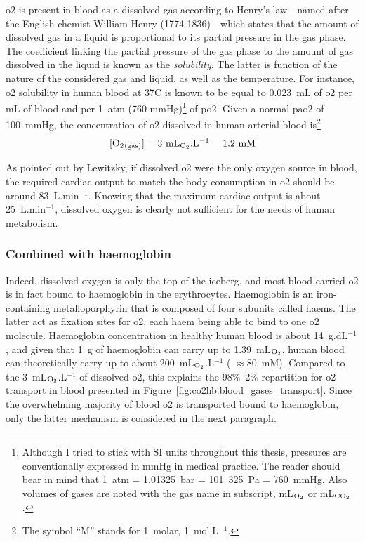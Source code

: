 \gls{o2} is present in blood as a dissolved gas according to Henry's law---named after the English chemist William Henry (1774-1836)---which states that the amount of dissolved gas in a liquid is proportional to its partial pressure in the gas phase\cite{henry1803}. The coefficient linking the partial pressure of the gas phase to the amount of gas dissolved in the liquid is known as the \emph{solubility}. The latter is function of the nature of the considered gas and liquid, as well as the temperature. For instance, \gls{o2} solubility in human blood at 37{\degree}C is known to be equal to 0.023~mL of \gls{o2} per mL of blood and per 1~atm (760 mmHg)\footnote{Although I tried to stick with SI units throughout this thesis, pressures are conventionally expressed in mmHg in medical practice. The reader should bear in mind that 1~atm = 1.01325~bar = 101~325~Pa = 760~mmHg. Also volumes of gases are noted with the gas name in subscript, \eg{} mL$_{\ce{O2}}$ or mL$_{\ce{CO2}}$.} of \gls{po2}\cite{resp_care}. Given a normal \gls{pao2} of 100~mmHg\cite{malatesha2007}, the concentration of \gls{o2} dissolved in human arterial blood is\footnote{The symbol \enquote{M} stands for 1~molar, \ie{} 1~mol.L$^{-1}$.}
\begin{equation}
	\ce{[O2_{(gas)}]} = 3 \text{ mL}_{\ce{O2}}.\text{L}^{-1} = 1.2 \text{ mM}
\end{equation}

As pointed out by Lewitzky\cite[p.~143]{levitzky2003pulmonary}, if dissolved \gls{o2} were the only oxygen source in blood, the required cardiac output to match the body consumption in \gls{o2} should be around 83~L.min$^{-1}$. Knowing that the maximum cardiac output is about 25~L.min$^{-1}$, dissolved oxygen is clearly not sufficient for the needs of human metabolism.

\subsubsection{Combined with haemoglobin}

Indeed, dissolved oxygen is only the top of the iceberg, and most blood-carried \gls{o2} is in fact bound to haemoglobin in the erythrocytes. Haemoglobin is an iron-containing metalloporphyrin that is composed of four subunits called haems. The latter act as fixation sites for \gls{o2}, each haem being able to bind to one \gls{o2} molecule\cite{antonini1970}. Haemoglobin concentration in healthy human blood is about 14~g.dL$^{-1}$, and given that 1~g of haemoglobin can carry up to 1.39~mL$_{\ce{O2}}$, human blood can theoretically carry up to about 200~mL$_{\ce{O2}}$.L$^{-1}$\cite[Chap.~11]{nunns} (\ie{} $\approx80$~mM). Compared to the 3~mL$_{\ce{O2}}$.L$^{-1}$ of dissolved \gls{o2}, this explains the 98\%--2\% repartition for \gls{o2} transport in blood presented in Figure~\ref{fig:co2hb:blood_gases_transport}. Since the overwhelming majority of blood \gls{o2} is transported bound to haemoglobin, only the latter mechanism is considered in the next paragraph.

